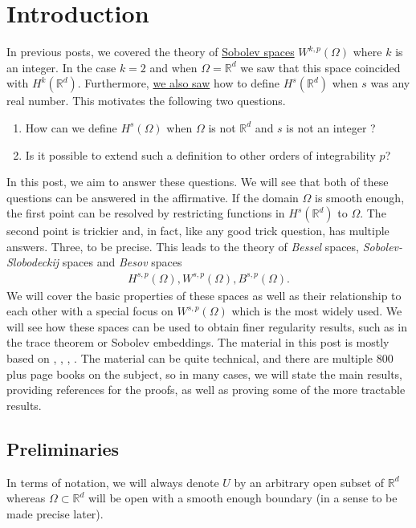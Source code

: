 \documentclass[
    a4paper,
    DIV=14,
    abstract=true,
    numbers=noenddot
]
{scrartcl}
\theoremstyle{definition}
\newcommand{\R}{\mathbb{R}}
\begin{document}
\section{Introduction}
In previous posts, we covered the theory of \href{https://nowheredifferentiable.com/2023-07-12-PDEs-3-Sobolev_spaces/}{Sobolev spaces} $W^{k,p}(\Omega )$ where $k$ is an integer. In the case $k=2$ and when $\Omega =\R^d$ we saw that this space coincided with $H^k(\R^d)$. Furthermore, \href{https://nowheredifferentiable.com/2023-01-29-PDE-1-Fourier/}{we also saw} how to define $H^s(\R^d)$ when $s$ was any real number. This motivates the following two questions.
\begin{enumerate}
    \item How can we define $H^s(\Omega )$  when $\Omega $ is not $\R^d$ and $s$ is not an integer ?
    \item Is it possible to extend such a definition to other orders of integrability $p$?
\end{enumerate}
In this post, we aim to answer these questions. We will see that both of these questions can be answered in the affirmative. If the domain $\Omega $  is smooth enough, the first point can be resolved by restricting functions in $H^s(\R^d)$ to $\Omega $. The second point is trickier and, in fact, like any good trick question, has multiple answers. Three, to be precise. This leads to the theory of \emph{Bessel} spaces, \emph{Sobolev-Slobodeckij} spaces and \emph{Besov} spaces
\begin{align*}
    H^{s,p}(\Omega ),W^{s,p}(\Omega ),B^{s,p}(\Omega ).
\end{align*}
We will cover the basic properties of these spaces as well as their relationship to each other with a special focus on $W^{s,p}(\Omega )$ which is the most widely used.  We will see how these spaces can be used to obtain finer regularity results, such as in the trace theorem or Sobolev embeddings. The material in this post is mostly based on \cite{leoni2023first}, \cite{agranovich2015sobolev}, \cite{di2012hitchhiker's}, \cite{triebel1992theory}. The material can be quite technical, and there are multiple $800$ plus page books on the subject, so in many cases, we will state the main results, providing references for the proofs, as well as proving some of the more tractable results.
\subsection{Preliminaries}
In terms of notation, we will always denote $U$ by an arbitrary open subset of $\R^d$  whereas $\Omega \subset \R^d $ will be open with a smooth enough boundary (in a sense to be made precise later).
\end{document}
